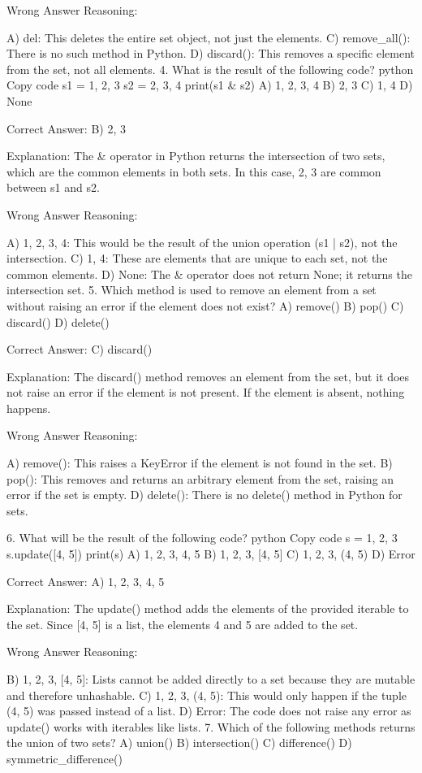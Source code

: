 Wrong Answer Reasoning:

A) del: This deletes the entire set object, not just the elements.
C) remove_all(): There is no such method in Python.
D) discard(): This removes a specific element from the set, not all elements.
4. What is the result of the following code?
python
Copy code
s1 = {1, 2, 3}
s2 = {2, 3, 4}
print(s1 & s2)
A) {1, 2, 3, 4}
B) {2, 3}
C) {1, 4}
D) None

Correct Answer: B) {2, 3}

Explanation:
The & operator in Python returns the intersection of two sets, which are the common elements in both sets. In this case, {2, 3} are common between s1 and s2.

Wrong Answer Reasoning:

A) {1, 2, 3, 4}: This would be the result of the union operation (s1 | s2), not the intersection.
C) {1, 4}: These are elements that are unique to each set, not the common elements.
D) None: The & operator does not return None; it returns the intersection set.
5. Which method is used to remove an element from a set without raising an error if the element does not exist?
A) remove()
B) pop()
C) discard()
D) delete()

Correct Answer: C) discard()

Explanation:
The discard() method removes an element from the set, but it does not raise an error if the element is not present. If the element is absent, nothing happens.

Wrong Answer Reasoning:

A) remove(): This raises a KeyError if the element is not found in the set.
B) pop(): This removes and returns an arbitrary element from the set, raising an error if the set is empty.
D) delete(): There is no delete() method in Python for sets.

6. What will be the result of the following code?
python
Copy code
s = {1, 2, 3}
s.update([4, 5])
print(s)
A) {1, 2, 3, 4, 5}
B) {1, 2, 3, [4, 5]}
C) {1, 2, 3, (4, 5)}
D) Error

Correct Answer: A) {1, 2, 3, 4, 5}

Explanation:
The update() method adds the elements of the provided iterable to the set. Since [4, 5] is a list, the elements 4 and 5 are added to the set.

Wrong Answer Reasoning:

B) {1, 2, 3, [4, 5]}: Lists cannot be added directly to a set because they are mutable and therefore unhashable.
C) {1, 2, 3, (4, 5)}: This would only happen if the tuple (4, 5) was passed instead of a list.
D) Error: The code does not raise any error as update() works with iterables like lists.
7. Which of the following methods returns the union of two sets?
A) union()
B) intersection()
C) difference()
D) symmetric_difference()

